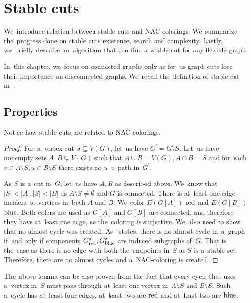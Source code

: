 
\chapter{Stable cuts}%
\label{chapter:stable_cuts}

\begin{chapterabstract}
	We~introduce relation between stable cuts and NAC-colorings.
	We~summarize the~progress done on stable cuts existence, search and complexity.
	Lastly, we~briefly describe an~algorithm that can find a~stable cut
	for any flexible graph.
\end{chapterabstract}


In~this chapter, we~focus on connected graphs only as for~us graph cuts
lose their importance on disconnected graphs.
We~recall the~definition of
stable cut in~.

\section{Properties}

Notice how stable cuts are related to NAC-colorings.
%
%
\begin{proof}
	For~a~vertex cut \( S \subseteq V(G) \), let~us have \( G^\prime = G \setminus S \).
	Let~us have nonempty sets \( A, B \subsetneq V(G) \) such that
	\( A \cup B = V(G), A \cap B = S \) and for~each \( v \in A \setminus S, u \in B \setminus S \)
	there exists no \( u \)--\( v \)--path in~\( G^\prime \).

	As \( S \) is a~cut in~\( G \), let~us have \( A, B \) as described above.
	We~know that \( |S| < |A|, |S| < |B| \)
	as \( A\setminus S \ne \emptyset{} \) and \( G \) is connected.
	There is at~least one edge incident to vertices in~both \( A \) and \( B \).
	We~color \( E(G[A]) \) \( \text{red} \) and \( E(G[B]) \) \( \text{blue} \).
	Both colors are used as \( G[A] \) and \( G[B] \) are connected,
	and therefore they have at~least one edge,
	so the~coloring is surjective.
	We~also need to show that no almost cycle was created.
	As~
	states, there is no almost cycle in~a~graph if~and only
	if components \( G_{\text{red}}^\delta, G_{\text{blue}}^\delta \)
	are induced subgraphs of~\( G \).
	That is the~case as there is no edge with both the~endpoints in~\( S \)
	as \( S \) is a~stable set.
	Therefore, there are no almost cycles and a~NAC-coloring is created.
\end{proof}
%
The~above lemma can be also proven from the~fact that every cycle that
uses a~vertex in~\( S \) must pass
through at~least one vertex in~\( A \setminus S \) and \( B \setminus S \).
Such a~cycle has at~least four edges,
at~least two are \( \text{red} \) and at~least two are \( \text{blue} \).

